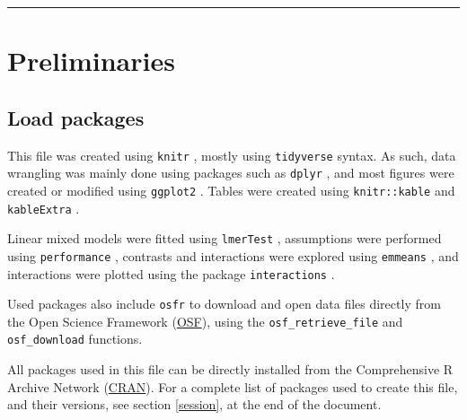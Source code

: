 \documentclass[
  bookmarksnumbered]{article}
\begin{document}
\par
\endgroup

{\hypersetup{hidelinks}
\setcounter{tocdepth}{6}
\tableofcontents
}
\opensupplement

\begin{center}\rule{0.5\linewidth}{0.5pt}\end{center}

\hypertarget{preliminaries}{%
\section{Preliminaries}\label{preliminaries}}

\hypertarget{load-packages}{%
\subsection{Load packages}\label{load-packages}}

This file was created using \texttt{knitr} \autocite{knitrcit}, mostly using \texttt{tidyverse} \autocite{tidyversecit} syntax. As such, data wrangling was mainly done using packages such as \texttt{dplyr} \autocite{dplyrcit}, and most figures were created or modified using \texttt{ggplot2} \autocite{ggplotcit}. Tables were created using \texttt{knitr::kable} and \texttt{kableExtra} \autocite{kableExtracit}.

Linear mixed models were fitted using \texttt{lmerTest} \autocite{lmertestcit}, assumptions were performed using \texttt{performance} \autocite{ludecke2021}, contrasts and interactions were explored using \texttt{emmeans} \autocite{emmeanscit}, and interactions were plotted using the package \texttt{interactions} \autocite{interactionscit}.

Used packages also include \texttt{osfr} \autocite{osfrcit} to download and open data files directly from the Open Science Framework (\href{https://osf.io/}{OSF}), using the \texttt{osf\_retrieve\_file} and \texttt{osf\_download} functions.

All packages used in this file can be directly installed from the Comprehensive R Archive Network (\href{https://cran.r-project.org/}{CRAN}). For a complete list of packages used to create this file, and their versions, see section \ref{session}, at the end of the document.
\end{document}
